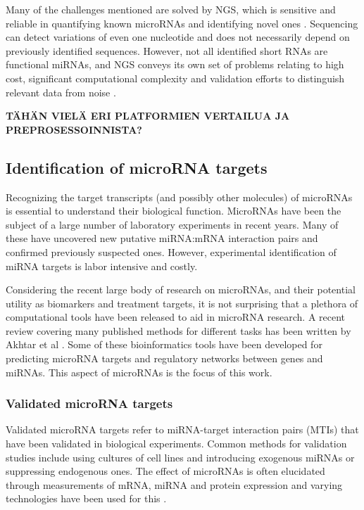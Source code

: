 Many of the challenges mentioned are solved by NGS, which is sensitive and
reliable in quantifying known microRNAs and identifying novel ones
\citep{Huang2011}. Sequencing can detect variations of even one nucleotide and
does not necessarily depend on previously identified sequences. However, not
all identified short RNAs are functional miRNAs, and NGS conveys its own set
of problems relating to high cost, significant computational complexity and
validation efforts to distinguish relevant data from noise
\citep{Chugh2012,Hunt2015}.

\textbf{TÄHÄN VIELÄ ERI PLATFORMIEN VERTAILUA JA PREPROSESSOINNISTA?}





\subsection{Identification of microRNA targets}


Recognizing the target transcripts (and possibly other molecules) of microRNAs
is essential to understand their biological function. MicroRNAs have been the
subject of a large number of laboratory experiments in recent years. Many of these have
uncovered new putative miRNA:mRNA interaction pairs and confirmed
previously suspected ones. However, experimental identification of miRNA targets
is labor intensive and costly.

Considering the recent large body of research on microRNAs, and their
potential utility as biomarkers and treatment targets, it is not surprising
that a plethora of computational tools have been released to aid in microRNA
research. A recent review covering many published methods for different tasks
has been written by Akhtar et al \citep{Akhtar2016}. Some of these
bioinformatics tools have been developed for predicting microRNA targets
and regulatory networks between genes and miRNAs.
This aspect of microRNAs is the focus of this work.



\subsubsection{Validated microRNA targets}

Validated microRNA targets refer to miRNA-target interaction pairs (MTIs) that have
been validated in biological experiments. Common methods for validation
studies include using cultures of cell lines and introducing exogenous miRNAs
or suppressing endogenous ones. The effect of microRNAs is often elucidated
through measurements of mRNA, miRNA and protein expression and varying
technologies have been used for this \citep{Akhtar2016}.

